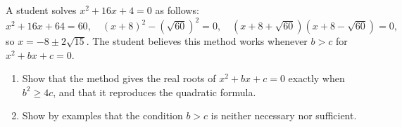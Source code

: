 A student solves $x^2+16x+4=0$ as follows:
\[
x^2+16x+64=60,\quad (x+8)^2-\left(\sqrt{60}\right)^2=0,\quad \left(x+8+\sqrt{60}\right)\left(x+8-\sqrt{60}\right)=0,
\]
so $x=-8\pm2\sqrt{15}$. The student believes this method works whenever $b>c$ for $x^2+bx+c=0$.
\begin{enumerate}
\item[(a)] Show that the method gives the real roots of $x^2+bx+c=0$ exactly when $b^2\ge4c$, and that it reproduces the quadratic formula.
\item[(b)] Show by examples that the condition $b>c$ is neither necessary nor sufficient.
\end{enumerate}
